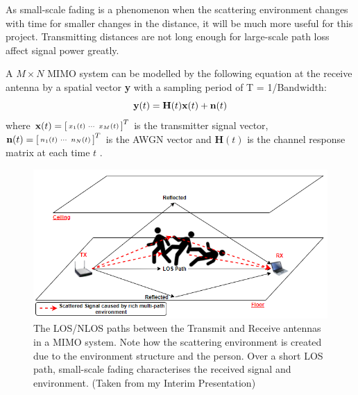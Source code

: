 As small-scale fading is a phenomenon when the scattering environment changes with time for smaller changes in the distance, it will be much more useful for this project. Transmitting distances are not long enough for large-scale path loss affect signal power greatly. \par
A $M\times N$ MIMO system can be modelled by the following equation at the receive antenna by a spatial vector \textbf{y} with a sampling period of T = 1/Bandwidth:
\vspace{-11pt}
\begin{equation}\label{eqn:2.1}
    \textbf{y}(t) = \textbf{H}(t)\textbf{x}(t)+\textbf{n}(t)
    \vspace{-11pt}
\end{equation}
where  $\textbf{x}(t) = \begin{bsmallmatrix}x_1(t) & \cdots & x_M(t)\end{bsmallmatrix}^T$ is the transmitter signal vector, $\textbf{n}(t) = \begin{bsmallmatrix}n_1(t) & \cdots & n_N(t)\end{bsmallmatrix}^T$ is the AWGN vector and $\textbf{H}(t)$ is the channel response matrix at each time $t$ \citep{channelEquations}. \par
\begin{figure}[h]
\begin{center}
  \includegraphics[scale=0.7]{Figures/tempInterim.PNG}
\end{center}
  \caption{The LOS/NLOS paths between the Transmit and Receive antennas in a MIMO system. Note how the scattering environment is created due to the environment structure and the person. Over a short LOS path, small-scale fading characterises the received signal and environment. (Taken from my Interim Presentation)}
  \vspace{-22pt}
  \label{fig:LOS_NLOS}
\end{figure}
